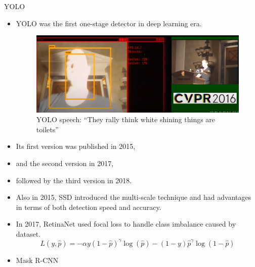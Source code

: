 \documentclass{beamer}
\begin{document}
\begin{frame}[<+-| alert@+>]{YOLO}
    \begin{itemize}
        \item YOLO was the first one-stage detector in deep learning era.
            \begin{figure}
                \centering
                \includegraphics[width=1\linewidth]{yolo.png}
                \caption{YOLO speech: “They rally think white shining things are toilets”}
                \label{fig:my_label}
            \end{figure}
        \item Its first version\cite{yolo} was published in 2015,
        \item and the second version\cite{yolo9000} in 2017,
        \item followed by the third version\cite{yolov3} in 2018.
        
    \end{itemize}
    
\end{frame}

\begin{frame}[<+-| alert@+>]
    \begin{itemize}
        \item Also in 2015, SSD introduced the multi-scale technique and had advantages in terms of both detection speed and accuracy.
        \item  In 2017, RetinaNet used focal loss to handle class imbalance caused by dataset.
        \begin{equation}
            L(y, \hat{p})
= -\alpha y \left(1 - \hat{p}\right)^\gamma \log(\hat{p})
- (1 - y) \hat{p}^\gamma \log(1 - \hat{p})
        \end{equation}
    
    \item Mask R-CNN
        
    \end{itemize}
    
\end{frame}
  
\end{document}
